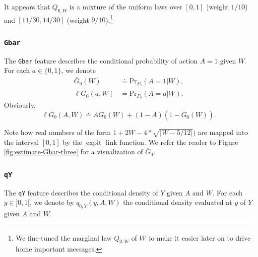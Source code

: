 \documentclass[11pt,openright,twoside]{book}
\newenvironment{Shaded}{\begin{snugshade}}{\end{snugshade}}
\newcommand{\CommentTok}[1]{\textcolor[rgb]{0.56,0.35,0.01}{\textit{#1}}}
\newcommand{\NormalTok}[1]{#1}
\newcommand{\OperatorTok}[1]{\textcolor[rgb]{0.81,0.36,0.00}{\textbf{#1}}}
\DeclareMathOperator{\expit}{expit}
\newcommand{\defq}{\doteq}
\newcommand{\Gbar}{\bar{G}}
\renewcommand{\Pr}{\textrm{Pr}}
\theoremstyle{definition}
\theoremstyle{definition}
\theoremstyle{definition}
\theoremstyle{remark}
\begin{document}
It appears that \(Q_{0,W}\) is a mixture of the uniform laws over \([0,1]\)
(weight \(1/10\)) and \([11/30,14/30]\) (weight \(9/10\)).\footnote{We fine-tuned the
  marginal law \(Q_{0,W}\) of \(W\) to make it easier later on to drive home
  important messages.}

\hypertarget{gbar}{%
\subsubsection*{\texorpdfstring{\texttt{Gbar}}{Gbar}}\label{gbar}}

The \texttt{Gbar} feature describes the conditional probability of action \(A = 1\)
given \(W\). For each \(a \in \{0,1\}\), we denote \begin{align*}  \Gbar_0(W)
&\defq \Pr_{P_0}(A  = 1 |  W), \\\ell\Gbar_0(a,W)  &\defq \Pr_{P_0}(A =  a |
W).\end{align*} Obviously, \begin{equation*}\ell\Gbar_{0}(A,W)    \defq
A\Gbar_{0}(W) + (1-A) (1-\Gbar_{0}(W)).\end{equation*}

\begin{Shaded}
\end{Shaded}

Note how real numbers of the form \(1 + 2W - 4 * \sqrt{|W - 5/12|})\) are mapped
into the interval \([0,1]\) by the \(\expit\) link function. We refer the reader
to Figure \ref{fig:estimate-Gbar-three} for a visualization of \(\Gbar_{0}\).

\hypertarget{qy}{%
\subsubsection*{\texorpdfstring{\texttt{qY}}{qY}}\label{qy}}

The \texttt{qY} feature describes the conditional density of \(Y\) given \(A\) and \(W\).
For each \(y\in ]0,1[\), we denote by \(q_{0,Y}(y, A, W)\) the conditional density
evaluated at \(y\) of \(Y\) given \(A\) and \(W\).
\end{document}
